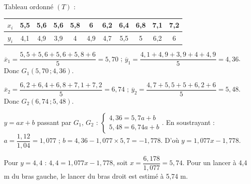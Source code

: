 \documentclass[11pt]{article}
\begin{document}
\begin{questions}
  \begin{center}
  \end{center}
\end{questions}

\begin{questions}
  \item \begin{sousq}
    \item Tableau ordonné $(T)$ :
    \begin{center}\renewcommand{\arraystretch}{1.4}
    \begin{tabular}{|c|c|c|c|c|c|c|c|c|c|c|}
    \hline $x_i$ & 5{,}5 & 5{,}6 & 5{,}6 & 5{,}8 & 6 & 6{,}2 & 6{,}4 & 6{,}8 & 7{,}1 & 7{,}2 \\
    \hline $y_i$ & 4{,}1 & 4{,}9 & 3{,}9 & 4 & 4{,}9 & 4{,}7 & 5{,}5 & 5 & 6{,}2 & 6 \\
    \hline
    \end{tabular}
    \end{center}
    \item $\overline{x}_1 = \dfrac{5{,}5 + 5{,}6 + 5{,}6 + 5{,}8 + 6}{5} = 5{,}70$ ; $\overline{y}_1 = \dfrac{4{,}1 + 4{,}9 + 3{,}9 + 4 + 4{,}9}{5} = 4{,}36$. Donc $G_1(5{,}70\,;4{,}36)$.
    \item $\overline{x}_2 = \dfrac{6{,}2 + 6{,}4 + 6{,}8 + 7{,}1 + 7{,}2}{5} = 6{,}74$ ; $\overline{y}_2 = \dfrac{4{,}7 + 5{,}5 + 5 + 6{,}2 + 6}{5} = 5{,}48$. Donc $G_2(6{,}74\,;5{,}48)$.
  \end{sousq}
  \item \begin{sousq}
    \item $y = ax + b$ passant par $G_1$, $G_2$ : $\begin{cases} 4{,}36 = 5{,}7a + b \\ 5{,}48 = 6{,}74a + b \end{cases}$. En soustrayant : $a = \dfrac{1{,}12}{1{,}04} = 1{,}077$ ; $b = 4{,}36 - 1{,}077\times 5{,}7 = -1{,}778$. D'où $y = 1{,}077x - 1{,}778$.
    \item Pour $y = 4{,}4$ : $4{,}4 = 1{,}077x - 1{,}778$, soit $x = \dfrac{6{,}178}{1{,}077} = 5{,}74$. Pour un lancer à 4,4 m du bras gauche, le lancer du bras droit est estimé à 5,74 m.
  \end{sousq}
\end{questions}
\end{document}
